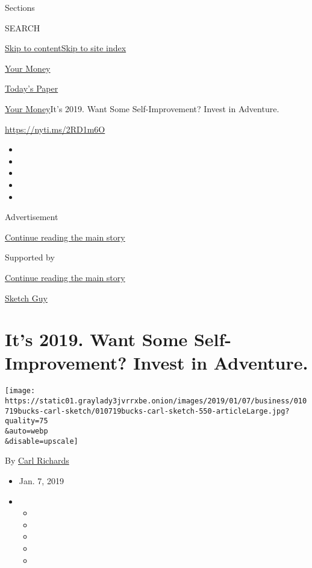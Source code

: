 Sections

SEARCH

\protect\hyperlink{site-content}{Skip to
content}\protect\hyperlink{site-index}{Skip to site index}

\href{https://www.nytimes3xbfgragh.onion/section/your-money}{Your Money}

\href{https://myaccount.nytimes3xbfgragh.onion/auth/login?response_type=cookie\&client_id=vi}{}

\href{https://www.nytimes3xbfgragh.onion/section/todayspaper}{Today's
Paper}

\href{/section/your-money}{Your Money}\textbar{}It's 2019. Want Some
Self-Improvement? Invest in Adventure.

\url{https://nyti.ms/2RD1m6O}

\begin{itemize}
\item
\item
\item
\item
\item
\end{itemize}

Advertisement

\protect\hyperlink{after-top}{Continue reading the main story}

Supported by

\protect\hyperlink{after-sponsor}{Continue reading the main story}

\href{/column/sketch-guy}{Sketch Guy}

\hypertarget{its-2019-want-some-self-improvement-invest-in-adventure}{%
\section{It's 2019. Want Some Self-Improvement? Invest in
Adventure.}\label{its-2019-want-some-self-improvement-invest-in-adventure}}

\texttt{[image: https://static01.graylady3jvrrxbe.onion/images/2019/01/07/business/010719bucks-carl-sketch/010719bucks-carl-sketch-550-articleLarge.jpg?quality=75\\\&auto=webp\\\&disable=upscale]}

By \href{https://www.nytimes3xbfgragh.onion/by/carl-richards}{Carl
Richards}

\begin{itemize}
\item
  Jan. 7, 2019
\item
  \begin{itemize}
  \item
  \item
  \item
  \item
  \item
  \end{itemize}
\end{itemize}

